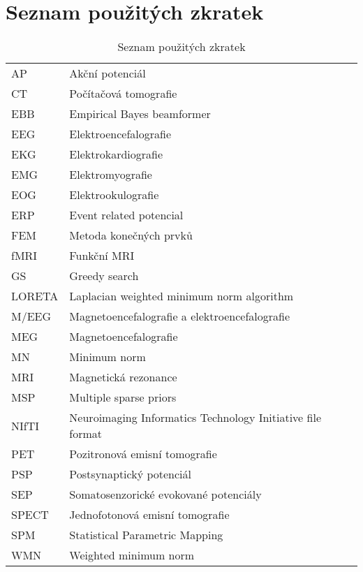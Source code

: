 \documentclass[twoside]{casti/sablona/ctuthesis}
\theoremstyle{plain}
\theoremstyle{definition}
\theoremstyle{note}
\begin{document}
\maketitle















\appendix
\printindex
\appendix



\chapter{Seznam použitých zkratek}
\begin{table}[!htb]
\centering
\caption{Seznam použitých zkratek}
\label{my-label}
\begin{tabular}{ll}
AP & Akční potenciál \\
CT & Počítačová tomografie \\
EBB & Empirical Bayes beamformer \\
EEG & Elektroencefalografie \\
EKG & Elektrokardiografie \\
EMG & Elektromyografie \\
EOG & Elektrookulografie \\
ERP & Event related potencial \\
FEM & Metoda konečných prvků \\
fMRI & Funkční MRI \\
GS & Greedy search \\
LORETA &  Laplacian weighted minimum norm algorithm \\
M/EEG & Magnetoencefalografie a elektroencefalografie \\
MEG & Magnetoencefalografie \\
MN & Minimum norm \\
MRI & Magnetická rezonance \\
MSP & Multiple sparse priors \\
NIfTI & Neuroimaging Informatics Technology Initiative file format \\
PET & Pozitronová emisní tomografie \\
PSP & Postsynaptický potenciál \\
SEP & Somatosenzorické evokované potenciály \\
SPECT & Jednofotonová emisní tomografie \\
SPM & Statistical Parametric Mapping \\
WMN & Weighted minimum norm
\end{tabular}
\end{table}
\end{document}
